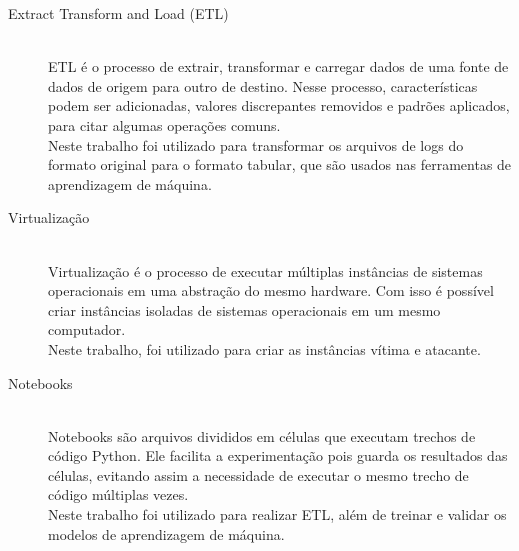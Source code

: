 \begin{description}
    \item[Extract Transform and Load (ETL)] \hfill \\ ETL é o processo de extrair, transformar 
    e carregar dados de uma fonte de dados de origem para outro de destino. Nesse processo, 
    características podem ser adicionadas, valores discrepantes removidos e padrões aplicados,
    para citar algumas operações comuns. \\ 
    Neste trabalho foi utilizado para transformar os arquivos de logs do formato original para 
    o formato tabular, que são usados nas ferramentas de aprendizagem de máquina.
    \item[Virtualização] \hfill \\ Virtualização é o processo de executar múltiplas instâncias 
    de sistemas operacionais em uma abstração do mesmo hardware. Com isso é possível 
    criar instâncias isoladas de sistemas operacionais em um mesmo computador. \\
    Neste trabalho, foi utilizado para criar as instâncias vítima e atacante.
    \item[Notebooks] \hfill \\ Notebooks são arquivos divididos em células que executam
    trechos de código Python. Ele facilita a experimentação pois guarda os resultados das
    células, evitando assim a necessidade de executar o mesmo trecho de código múltiplas
    vezes. \\ 
    Neste trabalho foi utilizado para realizar ETL, além de treinar e validar os modelos
    de aprendizagem de máquina. 
\end{description}